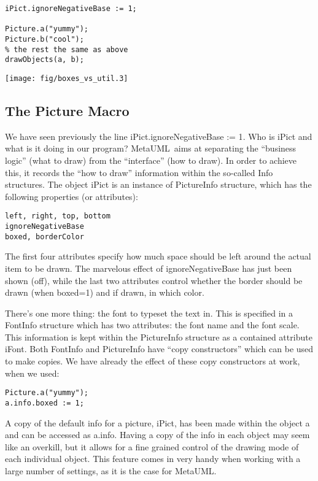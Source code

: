 \documentclass{article}
\newcommand{\code}{\ttfamily}
\newcommand{\metauml}{MetaUML}
\begin{document}
\begin{multicols}{2}
\begin{verbatim}
iPict.ignoreNegativeBase := 1;

Picture.a("yummy");
Picture.b("cool");
% the rest the same as above
drawObjects(a, b);
\end{verbatim}
\columnbreak
\hspace{1cm}\texttt{[image: fig/boxes\_vs\_util.3]}
\end{multicols}

\subsection{The Picture Macro}

We have seen previously the line {\code iPict.ignoreNegativeBase := 1}.
Who is {\code iPict} and what is it doing in our program? \metauml\
aims at separating the ``business logic'' (what to draw) from the
``interface'' (how to draw). In order to achieve this, it records the ``how to draw''
information within the so-called {\code Info} structures. The object {\code iPict}
is an instance of {\code PictureInfo} structure, which has the following properties
(or attributes):
\begin{verbatim}
left, right, top, bottom
ignoreNegativeBase
boxed, borderColor
\end{verbatim}

The first four attributes specify how much space should be left around the
actual item to be drawn. The marvelous effect of {\code ignoreNegativeBase}
has just been shown (off), while the last two attributes control whether the border
should be drawn (when {\code boxed=1}) and if drawn, in which color.

There's one more thing: the font to typeset the text in. This is specified
in a {\code FontInfo} structure which has two attributes: the font name
and the font scale. This information is kept within the {\code PictureInfo} structure
as a contained attribute {\code iFont}. Both {\code FontInfo} and {\code PictureInfo}
have ``copy constructors'' which can be used to make copies. We have already
the effect of these copy constructors at work, when we used:

\begin{verbatim}
Picture.a("yummy");
a.info.boxed := 1;
\end{verbatim}

A copy of the default info for a picture, {\code iPict}, has been made within
the object {\code a} and can be accessed as {\code a.info}. Having a copy of the
info in each object may seem like an overkill, but it allows for a fine grained
control of the drawing mode of each individual object. This feature comes in very
handy when working with a large number of settings, as it is the case for \metauml.
\end{document}
